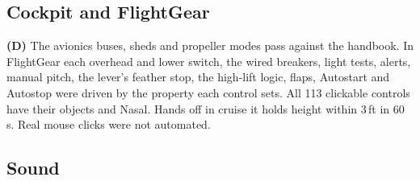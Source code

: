 \documentclass[10pt,a4paper,twocolumn]{article}
\begin{document}
\subsection{Cockpit and FlightGear}
\textbf{(D)} The avionics buses, sheds and propeller modes pass against the handbook. In FlightGear each overhead and lower switch, the wired breakers, light tests, alerts, manual pitch, the lever's feather stop, the high-lift logic, flaps, Autostart and Autostop were driven by the property each control sets. All 113 clickable controls have their objects and Nasal. Hands off in cruise it holds height within 3\,ft in 60\,s. Real mouse clicks were not automated.

\subsection{Sound}
\end{document}
